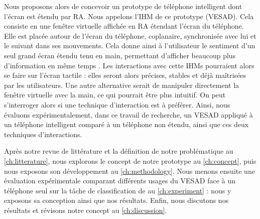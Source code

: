 Nous proposons alors de concevoir un prototype de téléphone intelligent dont l'écran est étendu par RA. Nous appelons l'IHM de ce prototype  (VESAD). Cela consiste en une fenêtre virtuelle affichée en RA étendant l'écran du téléphone. Elle est placée autour de l'écran du téléphone, coplanaire, synchronisée avec lui et le suivant dans ses mouvements. Cela donne ainsi à l'utilisateur le sentiment d'un seul grand écran étendu tenu en main, permettant d'afficher beaucoup plus d'information en même temps . Les interactions avec cette IHMs pourraient alors se faire sur l'écran tactile : elles seront alors précises, stables et déjà maîtrisées par les utilisateurs. Une autre alternative serait de manipuler directement la fenêtre virtuelle avec la main, ce qui pourrait être plus intuitif. On peut s'interroger alors si une technique d'interaction est à préférer. Ainsi, nous évaluons expérimentalement, dans ce travail de recherche, un VESAD appliqué à un téléphone intelligent comparé à un téléphone non étendu, ainsi que ces deux techniques d'interactions.

Après notre revue de littérature et la définition de notre problématique au \autoref{ch:litterature}, nous explorons le concept de notre prototype au \autoref{ch:concept}, puis nous exposons son développement au \autoref{ch:methodology}. Nous menons ensuite une évaluation expérimentale comparant différents usages du VESAD face à un téléphone seul sur la tâche de classification de \cite{Liu2014} au \autoref{ch:experiment} : nous y exposons sa conception ainsi que nos résultats. Enfin, nous discutons nos résultats et révisons notre concept au \autoref{ch:discussion}.
